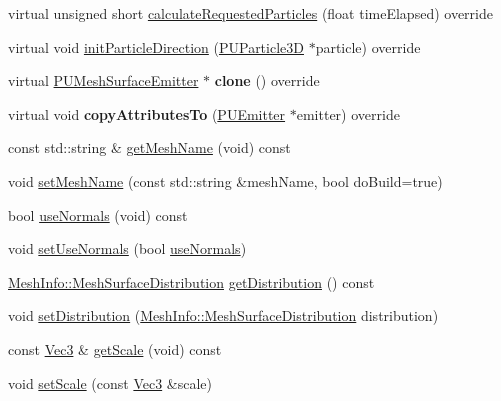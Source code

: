 \begin{DoxyCompactItemize}
virtual unsigned short \hyperlink{classPUMeshSurfaceEmitter_a55da45968254f20c920eb4327eb74b62}{calculate\+Requested\+Particles} (float time\+Elapsed) override
\item 
virtual void \hyperlink{classPUMeshSurfaceEmitter_a82636aed091cff08d53a109343895f35}{init\+Particle\+Direction} (\hyperlink{structPUParticle3D}{P\+U\+Particle3D} $\ast$particle) override
\item 
\mbox{\label{classPUMeshSurfaceEmitter_a3a9cd18d45dabd8a55780fa801cc9a0d}} 
virtual \hyperlink{classPUMeshSurfaceEmitter}{P\+U\+Mesh\+Surface\+Emitter} $\ast$ {\bfseries clone} () override
\item 
\mbox{\label{classPUMeshSurfaceEmitter_ae9086d63690ceffcd5f80bda991b1329}} 
virtual void {\bfseries copy\+Attributes\+To} (\hyperlink{classPUEmitter}{P\+U\+Emitter} $\ast$emitter) override
\item 
const std\+::string \& \hyperlink{classPUMeshSurfaceEmitter_a3a50ff04c22061515047634114663200}{get\+Mesh\+Name} (void) const
\item 
void \hyperlink{classPUMeshSurfaceEmitter_a48ff37dbec592524c2f706d6900cc709}{set\+Mesh\+Name} (const std\+::string \&mesh\+Name, bool do\+Build=true)
\item 
bool \hyperlink{classPUMeshSurfaceEmitter_a912bdee6b699413b072d4a9910f59b1b}{use\+Normals} (void) const
\item 
void \hyperlink{classPUMeshSurfaceEmitter_a688415b477c759993754d5b25957fc78}{set\+Use\+Normals} (bool \hyperlink{classPUMeshSurfaceEmitter_a912bdee6b699413b072d4a9910f59b1b}{use\+Normals})
\item 
\hyperlink{classMeshInfo_aadc99105abbc3bd033e33c6ba512a13b}{Mesh\+Info\+::\+Mesh\+Surface\+Distribution} \hyperlink{classPUMeshSurfaceEmitter_a214f28fc4cf1534a7e586c94c5fc3c6c}{get\+Distribution} () const
\item 
void \hyperlink{classPUMeshSurfaceEmitter_ae5908bb7c27ec91f47b4123a78edda7c}{set\+Distribution} (\hyperlink{classMeshInfo_aadc99105abbc3bd033e33c6ba512a13b}{Mesh\+Info\+::\+Mesh\+Surface\+Distribution} distribution)
\item 
const \hyperlink{classVec3}{Vec3} \& \hyperlink{classPUMeshSurfaceEmitter_abbe776f32d98127b2319805bd1c94636}{get\+Scale} (void) const
\item 
void \hyperlink{classPUMeshSurfaceEmitter_a029bba66d885414ad457f79c1d82f88b}{set\+Scale} (const \hyperlink{classVec3}{Vec3} \&scale)

\end{DoxyCompactItemize}
